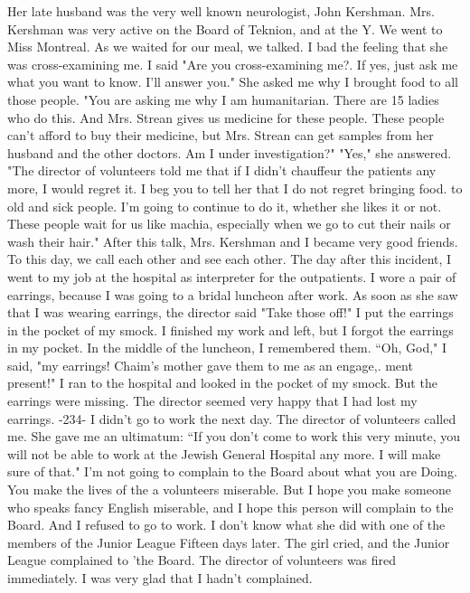 Her late husband was the very well known neurologist,
John Kershman.
Mrs.
Kershman was very active on the Board of Teknion, and at 
the Y. 
We went to Miss Montreal.
As we waited for our meal, we talked.
I bad the 
feeling that she was cross-examining me.
I said "Are you cross-examining me?.
If 
yes, just ask me what you want to know.
I'll answer you."
She asked me why I brought food to all those people.
"You are asking me why I am humanitarian.
There are 15 ladies who do this.
And Mrs.
Strean gives us medicine for these people.
These people can't afford to 
buy their medicine, but Mrs.
Strean can get samples from her husband and the other 
doctors.
Am I under investigation?"
"Yes," she answered.
"The director of volunteers told me that if I didn't chauffeur the patients any 
more, I would regret it.
I beg you to tell her that I do not regret bringing food.
to old and sick people.
I'm going to continue to do it, whether she likes it or 
not.
These people wait for us like machia, especially when we go to cut their nails 
or wash their hair."
After this talk, Mrs.
Kershman and I became very good friends.
To this day, we 
call each other and see each other.
The day after this incident, I went to my job at 
the hospital as interpreter for the outpatients.
I wore a pair of earrings, because I 
was going to a bridal luncheon after work.
As soon as she saw that I was wearing 
earrings, the director said "Take those off!"
I put the earrings in the pocket of 
my smock.
I finished my work and left, but I forgot the earrings in my pocket.
In the middle of the luncheon, I remembered them.
“Oh, God," I said, "my earrings!
Chaim’s mother gave them to me as an engage,.
ment present!"
I ran to the hospital and looked in the pocket of my smock.
But the 
earrings were missing.
The director seemed very happy that I had lost my earrings.
-234-
I didn't go to work the next day.
The director of volunteers 
called me.
She gave me an ultimatum: “If you don't come to work this 
very minute, you will not be able to work at the Jewish General Hospital any more.
I will make sure of that."
I'm not going to complain to the Board about what you are
Doing.
You make the lives of the a volunteers miserable.
But I hope you make someone
who speaks fancy English miserable, and I hope 
this person will complain to the Board.
And I refused to go to work.
I don’t know what she did with one of the members of the Junior League
Fifteen days later.
The girl cried, and the Junior League complained to 'the Board.
The director of volunteers was fired immediately.
I was very glad that I hadn't complained.
